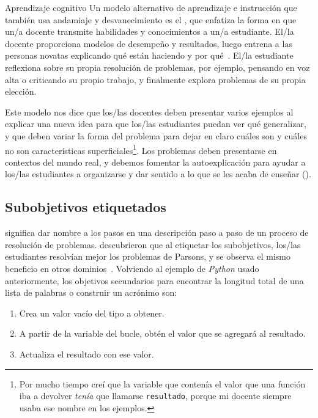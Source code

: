 \begin{aside}{Aprendizaje cognitivo}
  Un modelo alternativo de aprendizaje e instrucción que también usa andamiaje y desvanecimiento
  es el ,
  que enfatiza la forma en que un/a docente transmite habilidades y conocimientos a un/a estudiante.
  El/la docente proporciona modelos de desempeño y resultados,
  luego entrena a las personas novatas explicando qué están haciendo y por qué~\cite{Coll1991,Casp2007}.
  El/la estudiante reflexiona sobre su propia resolución de problemas,
  por ejemplo, pensando en voz alta o criticando su propio trabajo,
  y finalmente explora problemas de su propia elección.

  Este modelo nos dice que
  los/las docentes deben presentar varios ejemplos al explicar una nueva idea
  para que los/las estudiantes puedan ver qué generalizar,
  y que deben variar la forma del problema para dejar en claro
  cuáles son y cuáles no son características superficiales\footnote{Por mucho tiempo
     creí que la variable que contenía el valor que una función iba a devolver
     \emph{tenía} que llamarse \texttt{resultado},
     porque mi docente siempre usaba ese nombre en los ejemplos.}.    
  Los problemas deben presentarse en contextos del mundo real,
  y debemos fomentar la autoexplicación para ayudar a los/las estudiantes
  a organizarse y dar sentido a lo que se les acaba de enseñar
 ().
\end{aside}


\subsection*{Sub\-objetivos etiquetados}
 
 significa
dar nombre a los pasos en una descripción paso a paso de un proceso de resolución de problemas.
\cite{Marg2016,Morr2016} descubrieron que al etiquetar los sub\-objetivos, los/las estudiantes 
resolvían mejor los problemas de Parsons,
y se observa el mismo beneficio en otros dominios~\cite{Marg2012}.
Volviendo al ejemplo de \emph{Python} usado anteriormente,
los objetivos secundarios para encontrar la longitud total de una lista de palabras o construir un acrónimo son:

\begin{enumerate}

\item
  Crea un valor vacío del tipo a obtener.

\item
  A partir de la variable del bucle, obtén el valor que se agregará al resultado.

\item
  Actualiza el resultado con ese valor.

\end{enumerate}

